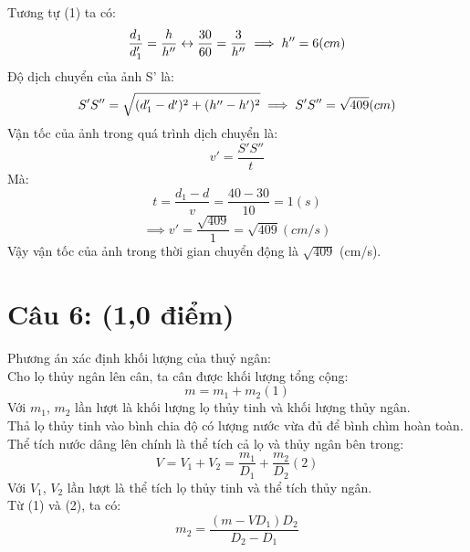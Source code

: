 \documentclass[50pt]{article}
\begin{document}
Tương tự (1)  ta có:
\begin{equation*}
    \dfrac{d_{1}}{d_{1}'} = \dfrac{h}{h''} \leftrightarrow \dfrac{30}{60} = \dfrac{3}{h''}\\
    \implies h'' = 6 (cm)
\end{equation*}
Độ dịch chuyển của ảnh S' là:\\
\begin{equation*}
    S'S'' = \sqrt{(d_{1}' - d')^2 + (h'' - h')^2}\\
    \implies S'S'' = \sqrt{409} (cm)\\
\end{equation*}
Vận tốc của ảnh trong quá trình dịch chuyển là:\\
\begin{equation*}
    v' = \dfrac{S'S''}{t}
\end{equation*}
Mà:
\begin{equation*}
    t = \dfrac{d_{1} - d}{v} = \dfrac{40 - 30}{10} = 1 (s)
\end{equation*}
\begin{equation*}
    \implies v' = \dfrac{\sqrt{409}}{1} = \sqrt{409} (cm/s)
\end{equation*}
Vậy vận tốc của ảnh trong thời gian chuyển động là $\sqrt{409}$ (cm/s).
\section*{\color[HTML]{4287f5}Câu 6: (1,0 điểm)}
Phương án xác định khối lượng của thuỷ ngân:\\
Cho lọ thủy ngân lên cân, ta cân được khối lượng tổng cộng:
\begin{equation*}
    m = m_{1} + m_{2} (1)
\end{equation*}
Với $m_{1}$, $m_{2}$ lần lượt là khối lượng lọ thủy tinh và khối lượng thủy ngân.\\
Thả lọ thủy tinh vào bình chia độ có lượng nước vừa đủ để bình chìm hoàn toàn. Thể tích nước dâng lên chính là thể tích cả lọ và thủy ngân bên trong:
\begin{equation*}
    V = V_{1} + V_{2} = \dfrac{m_{1}}{D_{1}} + \dfrac{m_{2}}{D_{2}} (2)
\end{equation*}
Với $V_{1}$, $V_{2}$ lần lượt là thể tích lọ thủy tinh và thể tích thủy ngân.\\
Từ (1) và (2), ta có:\\
\begin{equation*}
    m_{2} = \dfrac{(m - VD_{1})D_{2}}{D_{2} - D_{1}}
\end{equation*}
\end{document}
